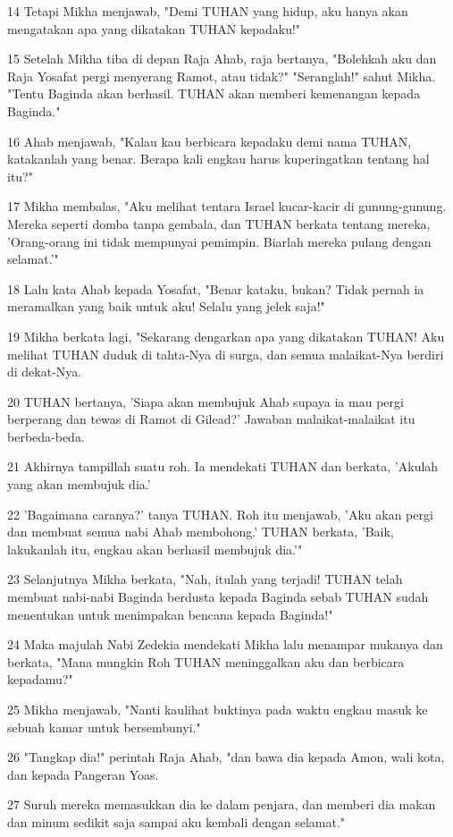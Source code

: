\par 14 Tetapi Mikha menjawab, "Demi TUHAN yang hidup, aku hanya akan mengatakan apa yang dikatakan TUHAN kepadaku!"
\par 15 Setelah Mikha tiba di depan Raja Ahab, raja bertanya, "Bolehkah aku dan Raja Yosafat pergi menyerang Ramot, atau tidak?" "Seranglah!" sahut Mikha. "Tentu Baginda akan berhasil. TUHAN akan memberi kemenangan kepada Baginda."
\par 16 Ahab menjawab, "Kalau kau berbicara kepadaku demi nama TUHAN, katakanlah yang benar. Berapa kali engkau harus kuperingatkan tentang hal itu?"
\par 17 Mikha membalas, "Aku melihat tentara Israel kucar-kacir di gunung-gunung. Mereka seperti domba tanpa gembala, dan TUHAN berkata tentang mereka, 'Orang-orang ini tidak mempunyai pemimpin. Biarlah mereka pulang dengan selamat.'"
\par 18 Lalu kata Ahab kepada Yosafat, "Benar kataku, bukan? Tidak pernah ia meramalkan yang baik untuk aku! Selalu yang jelek saja!"
\par 19 Mikha berkata lagi, "Sekarang dengarkan apa yang dikatakan TUHAN! Aku melihat TUHAN duduk di tahta-Nya di surga, dan semua malaikat-Nya berdiri di dekat-Nya.
\par 20 TUHAN bertanya, 'Siapa akan membujuk Ahab supaya ia mau pergi berperang dan tewas di Ramot di Gilead?' Jawaban malaikat-malaikat itu berbeda-beda.
\par 21 Akhirnya tampillah suatu roh. Ia mendekati TUHAN dan berkata, 'Akulah yang akan membujuk dia.'
\par 22 'Bagaimana caranya?' tanya TUHAN. Roh itu menjawab, 'Aku akan pergi dan membuat semua nabi Ahab membohong.' TUHAN berkata, 'Baik, lakukanlah itu, engkau akan berhasil membujuk dia.'"
\par 23 Selanjutnya Mikha berkata, "Nah, itulah yang terjadi! TUHAN telah membuat nabi-nabi Baginda berdusta kepada Baginda sebab TUHAN sudah menentukan untuk menimpakan bencana kepada Baginda!"
\par 24 Maka majulah Nabi Zedekia mendekati Mikha lalu menampar mukanya dan berkata, "Mana mungkin Roh TUHAN meninggalkan aku dan berbicara kepadamu?"
\par 25 Mikha menjawab, "Nanti kaulihat buktinya pada waktu engkau masuk ke sebuah kamar untuk bersembunyi."
\par 26 "Tangkap dia!" perintah Raja Ahab, "dan bawa dia kepada Amon, wali kota, dan kepada Pangeran Yoas.
\par 27 Suruh mereka memasukkan dia ke dalam penjara, dan memberi dia makan dan minum sedikit saja sampai aku kembali dengan selamat."
